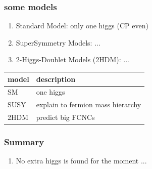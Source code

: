 \documentclass[10pt,reqno]{beamer}
\begin{document}
\begin{frame} 


\frametitle{some models}


\begin{enumerate}
\item Standard Model: only one higgs (CP even)
\item SuperSymmetry Models: ...
\item 2-Higgs-Doublet Models (2HDM): ...
\end{enumerate} 


\begin{table}\begin{tabular} {ll} 
 \hline\hline 
 model & description \\ 
\hline
 SM & one higgs \\ 
 SUSY & explain to fermion mass hierarchy \\ 
 2HDM & predict big FCNCs \\ 
\hline\hline 
 \end{tabular}\end{table} 





\end{frame} 

\begin{frame} 


\frametitle{Summary~\label{summary}}


\begin{enumerate}
\item No extra higgs is found for the moment ...
\end{enumerate} 





\end{frame} 
\end{document}
